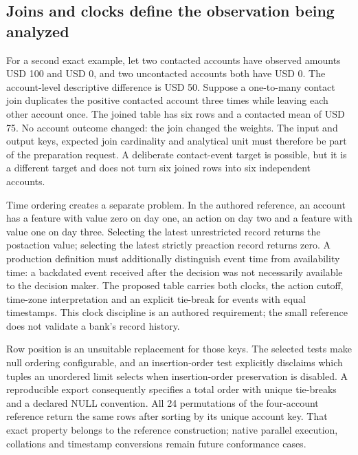 \subsection{Joins and clocks define the observation being analyzed}
\label{exec19:duckdb-keys}

For a second exact example, let two contacted accounts have observed amounts
USD 100 and USD 0, and two uncontacted accounts both have USD 0. The
account-level descriptive difference is USD 50. Suppose a one-to-many contact
join duplicates the positive contacted account three times while leaving each
other account once. The joined table has six rows and a contacted mean of
USD 75. No account outcome changed: the join changed the weights. The input
and output keys, expected join cardinality and analytical unit must therefore
be part of the preparation request. A deliberate contact-event target is
possible, but it is a different target and does not turn six joined rows into
six independent accounts.~\citep{exec19_duckdb_reference}

Time ordering creates a separate problem. In the authored reference, an
account has a feature with value zero on day one, an action on day two and a
feature with value one on day three. Selecting the latest unrestricted record
returns the postaction value; selecting the latest strictly preaction record
returns zero. A production definition must additionally distinguish event time
from availability time: a backdated event received after the decision was not
necessarily available to the decision maker. The proposed table carries both
clocks, the action cutoff, time-zone interpretation and an explicit tie-break
for events with equal timestamps. This clock discipline is an authored
requirement; the small reference does not validate a bank's record history.

Row position is an unsuitable replacement for those keys. The selected tests
make null ordering configurable, and an insertion-order test explicitly
disclaims which tuples an unordered limit selects when insertion-order
preservation is disabled. A reproducible export consequently specifies a total
order with unique tie-breaks and a declared NULL convention. All 24 permutations
of the four-account reference return the same rows after sorting by its unique
account key. That exact property belongs to the reference construction; native
parallel execution, collations and timestamp conversions remain future
conformance cases.~\citep{exec19_duckdb_source,exec19_duckdb_reference}


